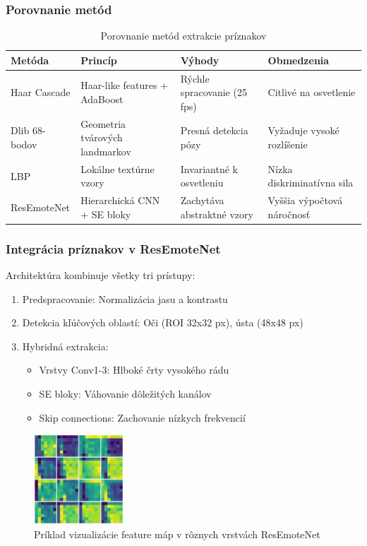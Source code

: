 \subsubsection{Porovnanie metód}
\begin{table}[H]
\centering
\begin{tabularx}{\textwidth}{|l|X|X|X|}
    \hline
    \textbf{Metóda} & \textbf{Princíp} & \textbf{Výhody} & \textbf{Obmedzenia} \\ \hline
    Haar Cascade & Haar-like features + AdaBoost & Rýchle spracovanie (25 fps) & Citlivé na osvetlenie \\ \hline
    Dlib 68-bodov & Geometria tvárových landmarkov & Presná detekcia pózy & Vyžaduje vysoké rozlíšenie \\ \hline
    LBP & Lokálne textúrne vzory & Invariantné k osvetleniu & Nízka diskriminatívna sila \\ \hline
    ResEmoteNet & Hierarchická CNN + SE bloky & Zachytáva abstraktné vzory & Vyššia výpočtová náročnosť \\ \hline
\end{tabularx}
\caption{Porovnanie metód extrakcie príznakov}
\end{table}

\subsubsection{Integrácia príznakov v ResEmoteNet}
Architektúra kombinuje všetky tri prístupy:
\begin{enumerate}
    \item Predspracovanie: Normalizácia jasu a kontrastu
    \item Detekcia kľúčových oblastí: Oči (ROI 32x32 px), ústa (48x48 px)
    \item Hybridná extrakcia:
    \begin{itemize}
        \item Vrstvy Conv1-3: Hlboké črty vysokého rádu
        \item SE bloky: Váhovanie dôležitých kanálov
        \item Skip connections: Zachovanie nízkych frekvencií
    \end{itemize}
\end{enumerate}

\begin{figure}[htpb!]
\centering
\includegraphics[width=0.3\textwidth]{img/feature_maps.png}
\caption{Príklad vizualizácie feature máp v rôznych vrstvách ResEmoteNet}
\label{fig:feature_maps}
\end{figure}
\newpage
